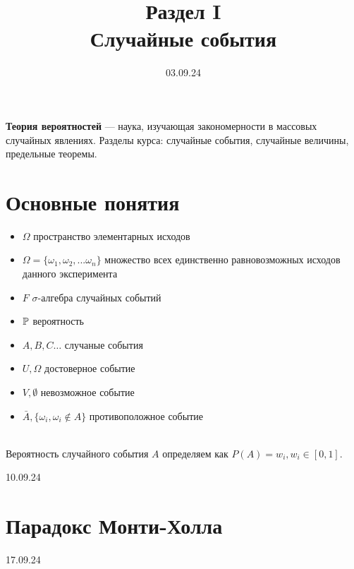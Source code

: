 

\title{Раздел I \\
       Случайные события}
\date{03.09.24}


    \maketitle
    
    \textbf{Теория вероятностей} — наука, изучающая закономерности 
    в массовых случайных явлениях. Разделы курса: случайные события, случайные 
    величины, предельные теоремы.

    \section{Основные понятия}

    \begin{itemize}
        \item \(\Omega\) пространство элементарных исходов 
        \item \(\Omega = \{\omega_1, \omega_2, ... \omega_n\}\)
        множество всех единственно равновозможных исходов данного эксперимента
        \item \(F\) \(\sigma\)-алгебра случайных событий
        \item \(\mathbb{P}\) вероятность
        \\
        \item \(A, B, C\dots\) случаные события
        \item \(U, \Omega\) достоверное событие
        \item \(V, \emptyset\) невозможное событие
        \item \(\bar A, \{\omega_i, \omega_i \notin A\}\) противоположное событие
    \end{itemize}
    \\
    Вероятность случайного события \(A\) определяем как \(P(A) = w_i, w_i \in [0,1]\).
    



    \vspace{2cm}
    \begin{center}\large{10.09.24}\end{center}
    \section{Парадокс Монти-Холла}




    \vspace{2cm}
    \begin{center}\large{17.09.24}\end{center}
